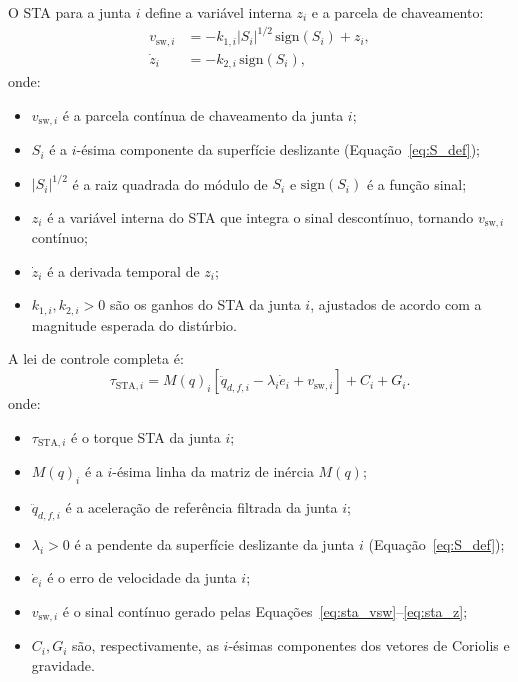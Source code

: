 O STA para a junta $i$ define a variável interna $z_i$ e a parcela de chaveamento:
\begin{align}
    v_{\text{sw},i} &= -k_{1,i}|S_i|^{1/2}\,\text{sign}(S_i) + z_i, \label{eq:sta_vsw}\\
    \dot{z}_i &= -k_{2,i}\,\text{sign}(S_i), \label{eq:sta_z}
\end{align}
onde:
\begin{itemize}
    \item $v_{\text{sw},i}$ é a parcela contínua de chaveamento da junta $i$;
    \item $S_i$ é a $i$-ésima componente da superfície deslizante (Equação~\eqref{eq:S_def});
    \item $|S_i|^{1/2}$ é a raiz quadrada do módulo de $S_i$ e $\text{sign}(S_i)$ é a função sinal;
    \item $z_i$ é a variável interna do STA que integra o sinal descontínuo, tornando $v_{\text{sw},i}$ contínuo;
    \item $\dot{z}_i$ é a derivada temporal de $z_i$;
    \item $k_{1,i}, k_{2,i} > 0$ são os ganhos do STA da junta $i$, ajustados de acordo com a magnitude esperada do distúrbio.
\end{itemize}

A lei de controle completa é:
\begin{equation}
    \tau_{\text{STA},i} = M(q)_i\left[\ddot{q}_{d,f,i} - \lambda_i\dot{e}_i + v_{\text{sw},i}\right] + C_i + G_i.
    \label{eq:sta_tau_cap5}
\end{equation}
onde:
\begin{itemize}
    \item $\tau_{\text{STA},i}$ é o torque STA da junta $i$;
    \item $M(q)_i$ é a $i$-ésima linha da matriz de inércia $M(q)$;
    \item $\ddot{q}_{d,f,i}$ é a aceleração de referência filtrada da junta $i$;
    \item $\lambda_i > 0$ é a pendente da superfície deslizante da junta $i$ (Equação~\eqref{eq:S_def});
    \item $\dot{e}_i$ é o erro de velocidade da junta $i$;
    \item $v_{\text{sw},i}$ é o sinal contínuo gerado pelas Equações~\eqref{eq:sta_vsw}--\eqref{eq:sta_z};
    \item $C_i, G_i$ são, respectivamente, as $i$-ésimas componentes dos vetores de Coriolis e gravidade.
\end{itemize}

